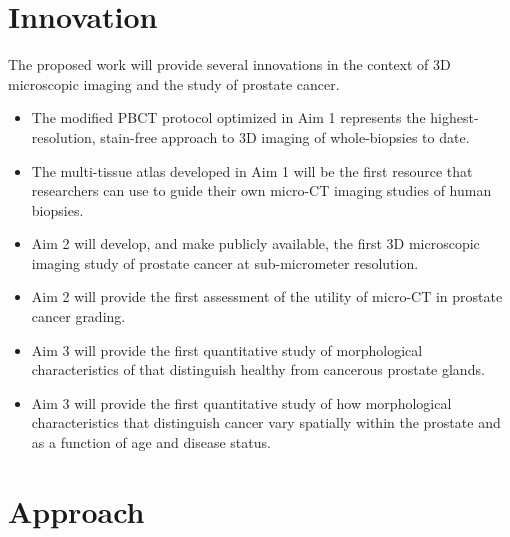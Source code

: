 \documentclass{NIHGrant}
\theoremstyle{theorem}
\begin{document}
\section*{Innovation}
The proposed work will provide several innovations in the context of 3D microscopic imaging and the study of prostate cancer.
\begin{itemize}[leftmargin=*, nosep]
\item The modified PBCT protocol optimized in Aim 1 represents the highest-resolution, stain-free approach to 3D imaging of whole-biopsies to date.
\item The multi-tissue atlas developed in Aim 1 will be the first resource that researchers can use to guide their own micro-CT imaging studies of human biopsies.
\item Aim 2 will develop, and make publicly available, the first 3D microscopic imaging study of prostate cancer at sub-micrometer resolution.
\item Aim 2 will provide the first assessment of the utility of micro-CT in prostate cancer grading.
\item Aim 3 will provide the first quantitative study of morphological characteristics of that distinguish healthy from cancerous prostate glands.
\item Aim 3 will provide the first quantitative study of how morphological characteristics that distinguish cancer vary spatially within the prostate and as a function of age and disease status.
\end{itemize}
%
\section*{Approach}

\end{document}
